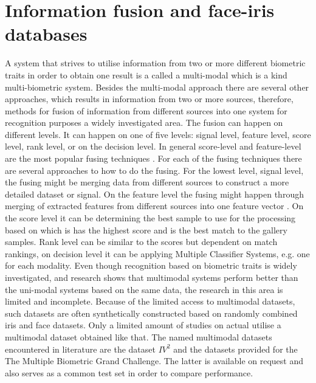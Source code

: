

\section{Information fusion and face-iris databases}

A system that strives to utilise information from two or more different biometric traits in order to obtain one result is a called a multi-modal which is a kind multi-biometric system. Besides the multi-modal approach there are several other approaches, which results in information from two or more sources, therefore, methods for fusion of information from different sources into one system for recognition purposes a widely investigated area.  The fusion can happen on different levels. It can happen on one of five levels: signal level, feature level, score level, rank level, or on the decision level. In general score-level and feature-level are the most popular fusing techniques \citep{Bowyer2016b}. For each of the fusing techniques there are several approaches to how to do the fusing. For the lowest level, signal level, the fusing might be merging data from different sources to construct a more detailed dataset or signal. On the feature level the fusing might happen through merging of extracted features from different sources into one feature vector \citep{Ross2003}. On the score level it can be determining the best sample to use for the processing based on which is has the highest score and is the best match to the gallery samples. Rank level can be similar to the scores but dependent on match rankings, on decision level it can be applying Multiple Classifier Systems, e.g. one for each modality\citep{Fierrez2018b}. 
Even though recognition based on biometric traits is widely investigated, and research shows that multimodal systems perform better than the uni-modal systems based on the same data, the research in this area is limited and incomplete. Because of the limited access to multimodal datasets, such datasets are often synthetically constructed based on randomly combined iris and face datasets. Only a limited amount of studies on actual utilise a multimodal dataset obtained like that. The named multimodal datasets encountered in literature are the dataset $IV^2$ and the datasets provided for the The Multiple Biometric Grand Challenge\citep{Bowyer2016b,Petrovska-Delacretaz2008a}. The latter is available on request and also serves as a common test set in order to compare performance.  